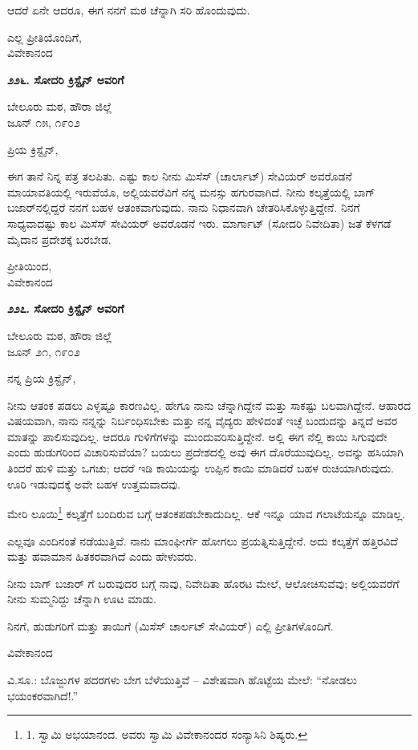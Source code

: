 ಆದರೆ ಏನೇ ಆದರೂ, ಈಗ ನನಗೆ ಮಠ ಚೆನ್ನಾಗಿ ಸರಿ ಹೊಂದುವುದು.

\begin{flushright}
ಎಲ್ಲ ಪ್ರೀತಿಯೊಂದಿಗೆ,\\ವಿವೇಕಾನಂದ
\end{flushright}

\begin{center}
\textbf{೨೨೬. ಸೋದರಿ ಕ್ರಿಸ್ಟೈನ್ ಅವರಿಗೆ}
\end{center}

\begin{flushright}
ಬೇಲೂರು ಮಠ, ಹೌರಾ ಜಿಲ್ಲೆ\\ಜೂನ್ ೧೫, ೧೯೦೨
\end{flushright}

ಪ್ರಿಯ ಕ್ರಿಸ್ಟೈನ್,

ಈಗ ತಾನೆ ನಿನ್ನ ಪತ್ರ ತಲಪಿತು. ಎಷ್ಟು ಕಾಲ ನೀನು ಮಿಸೆಸ್ (ಚಾರ್ಲಾಟ್) ಸೇವಿಯರ್ ಅವರೊಡನೆ ಮಾಯಾವತಿಯಲ್ಲಿ ಇರುವೆಯೊ, ಅಲ್ಲಿಯವರೆವಿಗೆ ನನ್ನ ಮನಸ್ಸು ಹಗುರವಾಗಿದೆ. ನೀನು ಕಲ್ಕತ್ತೆಯಲ್ಲಿ ಬಾಗ್ ಬಜಾರ್‌ನಲ್ಲಿದ್ದರೆ ನನಗೆ ಬಹಳ ಆತಂಕವಾಗುವುದು. ನಾನು ನಿಧಾನವಾಗಿ ಚೇತರಿಸಿಕೊಳ್ಳುತ್ತಿದ್ದೇನೆ. ನಿನಗೆ ಸಾಧ್ಯವಾದಷ್ಟು ಕಾಲ ಮಿಸೆಸ್ ಸೇವಿಯರ್ ಅವರೊಡನೆ ಇರು. ಮಾರ್ಗಾಟ್ (ಸೋದರಿ ನಿವೇದಿತಾ) ಜತೆ ಕೆಳಗಡೆ ಮೈದಾನ ಪ್ರದೇಶಕ್ಕೆ ಬರಬೇಡ.

\begin{flushright}
ಪ್ರೀತಿಯಿಂದ,\\ವಿವೇಕಾನಂದ
\end{flushright}

\begin{center}
\textbf{೨೨೭. ಸೋದರಿ ಕ್ರಿಸ್ಟೈನ್ ಅವರಿಗೆ}
\end{center}

\begin{flushright}
ಬೇಲೂರು ಮಠ, ಹೌರಾ ಜಿಲ್ಲೆ\\ಜೂನ್ ೨೧, ೧೯೦೨
\end{flushright}

ನನ್ನ ಪ್ರಿಯ ಕ್ರಿಸ್ಟೈನ್,

ನೀನು ಆತಂಕ ಪಡಲು ಎಳ್ಳಷ್ಟೂ ಕಾರಣವಿಲ್ಲ. ಹೇಗೂ ನಾನು ಚೆನ್ನಾಗಿದ್ದೇನೆ ಮತ್ತು ಸಾಕಷ್ಟು ಬಲವಾಗಿದ್ದೇನೆ. ಆಹಾರದ ವಿಷಯವಾಗಿ, ನಾನು ನನ್ನನ್ನು ನಿರ್ಬಂಧಿಸಬೇಕು ಮತ್ತು ನನ್ನ ವೈದ್ಯರು ಹೇಳಿದಂತೆ ಇಚ್ಛೆ ಬಂದುದನ್ನು ತಿನ್ನದೆ ಅವರ ಮಾತನ್ನು ಪಾಲಿಸುವುದಿಲ್ಲ. ಆದರೂ ಗುಳಿಗೆಗಳನ್ನು ಮುಂದುವರಿಸುತ್ತಿದ್ದೇನೆ. ಅಲ್ಲಿ ಈಗ ನೆಲ್ಲಿ ಕಾಯಿ ಸಿಗುವುದೇ ಎಂದು ಹುಡುಗರಿಂದ ವಿಚಾರಿಸುವೆಯಾ? ಬಯಲು ಪ್ರದೇಶದಲ್ಲಿ ಅವು ಈಗ ದೊರೆಯುವುದಿಲ್ಲ. ಅವನ್ನು ಹಸಿಯಾಗಿ ತಿಂದರೆ ಹುಳಿ ಮತ್ತು ಒಗಚು; ಆದರೆ ಇಡಿ ಕಾಯಿಯನ್ನು ಉಪ್ಪಿನ ಕಾಯಿ ಮಾಡಿದರೆ ಬಹಳ ರುಚಿಯಾಗಿರುವುದು. ಊರಿ ಇಡುವುದಕ್ಕೆ ಅವೇ ಬಹಳ ಉತ್ತಮವಾದವು.

ಮೇರಿ ಲೂಯಿ\footnote{1. ಸ್ವಾಮಿ ಅಭಯಾನಂದ. ಅವರು ಸ್ವಾಮಿ ವಿವೇಕಾನಂದರ ಸಂನ್ಯಾಸಿನಿ ಶಿಷ್ಯರು.} ಕಲ್ಕತ್ತೆಗೆ ಬಂದಿರುವ ಬಗ್ಗೆ ಆತಂಕಪಡಬೇಕಾದುದಿಲ್ಲ. ಆಕೆ ಇನ್ನೂ ಯಾವ ಗಲಾಟೆಯನ್ನೂ ಮಾಡಿಲ್ಲ.

ಎಲ್ಲವೂ ಎಂದಿನಂತೆ ನಡೆಯುತ್ತಿವೆ. ನಾನು ಮಾಂಘೀರ್ಗೆ ಹೋಗಲು ಪ್ರಯತ್ನಿಸುತ್ತಿದ್ದೇನೆ. ಅದು ಕಲ್ಕತ್ತೆಗೆ ಹತ್ತಿರವಿದೆ ಮತ್ತು ಹವಾಮಾನ ಹಿತಕರವಾಗಿದೆ ಎಂದು ಹೇಳುವರು.

ನೀನು ಬಾಗ್ ಬಜಾರ್ ಗೆ ಬರುವುದರ ಬಗ್ಗೆ ನಾವು, ನಿವೇದಿತಾ ಹೊರಟ ಮೇಲೆ, ಆಲೋಚಿಸುವೆವು; ಅಲ್ಲಿಯವರೆಗೆ ನೀನು ಸುಮ್ಮನಿದ್ದು ಚೆನ್ನಾಗಿ ಊಟ ಮಾಡು.

ನಿನಗೆ, ಹುಡುಗರಿಗೆ ಮತ್ತು ತಾಯಿಗೆ (ಮಿಸೆಸ್ ಚಾರ್ಲಟ್ ಸೇವಿಯರ್) ಎಲ್ಲಿ ಪ್ರೀತಿಗಳೊಂದಿಗೆ.

\begin{flushright}
ವಿವೇಕಾನಂದ
\end{flushright}

ವಿ.ಸೂ.: ಬೊಜ್ಜುಗಳ ಪದರಗಳು ಬೇಗ ಬೆಳೆಯುತ್ತಿವೆ – ವಿಶೇಷವಾಗಿ ಹೊಟ್ಟೆಯ ಮೇಲೆ: “ನೋಡಲು ಭಯಂಕರವಾಗಿದೆ!.”

